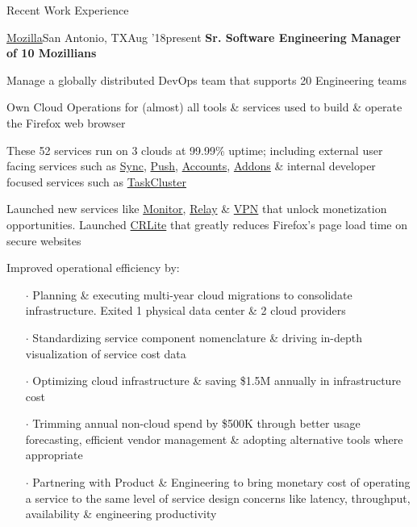 \documentclass{resume} %
\begin{document}
\begin{rSection}{Recent Work Experience}


\begin{rSubsection}{\href{https://www.mozilla.org/}{Mozilla}}{San Antonio, TX}{Aug '18}{present}
  {\textbf{Sr. Software Engineering Manager of 10 Mozillians}}

\item Manage a globally distributed DevOps team that supports 20 Engineering teams
\item Own Cloud Operations for (almost) all tools \& services used to build \& operate the Firefox web browser
\item These 52 services run on 3 clouds at 99.99\% uptime; including external user facing services such as \href{https://github.com/mozilla-services/syncstorage-rs}{Sync}, \href{https://github.com/mozilla-services/autopush-rs}{Push}, \href{https://github.com/mozilla/fxa}{Accounts}, \href{https://github.com/mozilla/addons}{Addons} \& internal developer focused services such as \href{https://github.com/taskcluster}{TaskCluster}
\item Launched new services like \href{https://monitor.firefox.com/}{Monitor}, \href{https://relay.firefox.com/}{Relay} \& \href{https://vpn.mozilla.org/}{VPN} that unlock monetization opportunities. Launched \href{https://blog.mozilla.org/security/2020/01/21/crlite-part-3-speeding-up-secure-browsing/}{CRLite} that greatly reduces Firefox's page load time on secure websites
  \item Improved operational efficiency by:
  \vspace{-0.5em}
    \begin{itemize} \itemsep0.5pt \parskip0pt
    \item[$\cdot$] Planning \& executing multi-year cloud migrations to consolidate infrastructure. Exited 1 physical data center \& 2 cloud providers
    \item[$\cdot$] Standardizing service component nomenclature \& driving in-depth visualization of service cost data
    \item[$\cdot$] Optimizing cloud infrastructure \& saving \$1.5M annually in infrastructure cost
    \item[$\cdot$] Trimming annual non-cloud spend by \$500K through better usage forecasting, efficient vendor management \& adopting alternative tools where appropriate
    \item[$\cdot$] Partnering with Product \& Engineering to bring monetary cost of operating a service to the same level of service design concerns like latency, throughput, availability \& engineering productivity

\end{itemize}
\end{rSubsection}
\end{rSection}
\end{document}
